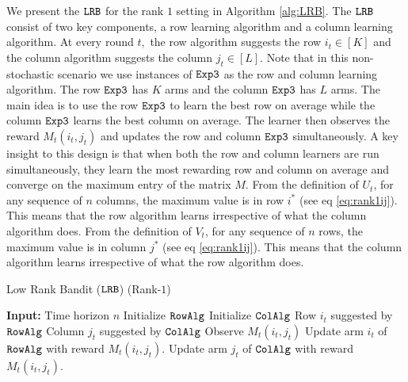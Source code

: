 We present the ${\tt LRB}$ for the rank $1$ setting in Algorithm \ref{alg:LRB}. The ${\tt LRB}$ consist of two key components, a row learning algorithm and a column learning algorithm. At every round $t,$ the row algorithm suggests the row $i_t \in [K]$ and the column algorithm suggests the column $j_t\in [L]$. Note that in this non-stochastic scenario we use instances of ${\tt Exp3}$ as the row and column learning algorithm. The row ${\tt Exp3}$ has $K$ arms and the column ${\tt Exp3}$ has $L$ arms. The main idea is to use the row ${\tt Exp3}$ to learn the best row on average while the column ${\tt Exp3}$ learns the best column on average. The learner then observes the reward $M_t(i_t, j_t)$ and updates the row and column ${\tt Exp3}$ simultaneously. A key insight to this design is that when both the row and column learners are run simultaneously, they learn the most rewarding row and column on average and converge on the maximum entry of the matrix $M$. From the definition of $U_t$, for any sequence of $n$ columns, the maximum value is in row $i^\ast$ (see eq \eqref{eq:rank1ij}). This means that the row algorithm learns irrespective of what the column algorithm does. From the definition of $V_t$, for any sequence of $n$ rows, the maximum value is in column $j^\ast$ (see eq \eqref{eq:rank1ij}). This means that the column algorithm learns irrespective of what the row algorithm does. %
\begin{algorithm}[t]
  \caption{Low Rank Bandit (${\tt LRB}$) (Rank-$1$)}
  \label{alg:LRB}
  \begin{algorithmic}[1]
    \State \textbf{Input:} Time horizon $n$
      \State Initialize ${\tt RowAlg} $
      \State Initialize ${\tt ColAlg} $
        \State Row $i_t$ suggested by ${\tt RowAlg}$
        \State Column $j_t$ suggested by ${\tt ColAlg}$
        \State Observe $M_t(i_t, j_t)$
    \State Update arm $i_t$ of ${\tt RowAlg}$ with reward $M_t(i_t, j_t)$.
    \State Update arm $j_t$ of ${\tt ColAlg}$ with reward $M_t(i_t, j_t)$.
     \EndFor
  \end{algorithmic}
\end{algorithm}
